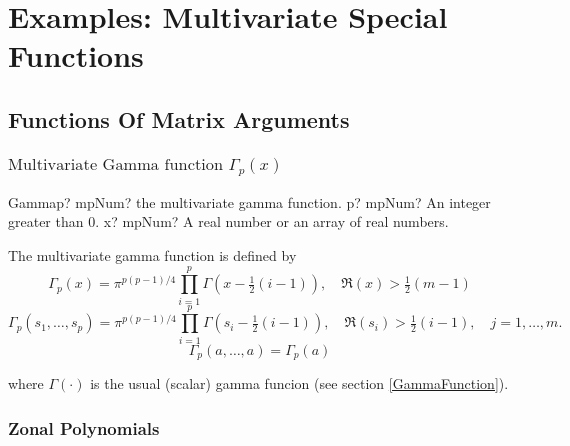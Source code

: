 

\chapter{Examples: Multivariate Special Functions}


\section{Functions Of Matrix Arguments}
\label{FunctionsOfMatrixArguments}



\subsection{\texorpdfstring{$\text{Multivariate Gamma function }\Gamma_p(x)$}{Multivariate Gamma}}
\label{MultivariateGammaFunction} 


\begin{mpFunctionsExtract}
	\mpFunctionTwoNotImplemented
	{Gammap? mpNum? the multivariate gamma function.}
	{p? mpNum? An integer greater than 0.}
	{x? mpNum? A real number or an array of real numbers.}	
\end{mpFunctionsExtract}


\vspace{0.3cm}
The multivariate gamma function is defined by
\begin{equation}
	\Gamma_p(x)  = \pi^{p(p-1)/4} \prod_{i=1}^p \Gamma\left(x-\tfrac{1}{2}(i-1)\right), \quad \Re(x) > \tfrac{1}{2}(m-1)
\end{equation}
\begin{equation}
	\Gamma_p(s_1,\ldots,s_p)  = \pi^{p(p-1)/4} \prod_{i=1}^p \Gamma\left(s_i-\tfrac{1}{2}(i-1)\right), \quad \Re(s_i) > \tfrac{1}{2}(i-1), \quad j=1,\ldots,m.
\end{equation}
\begin{equation}
	\Gamma_p(a,\ldots,a)  = \Gamma_p(a)
\end{equation}

where $\Gamma(\cdot)$ is the usual (scalar) gamma funcion (see section \ref{GammaFunction}).





\newpage
\subsection{Zonal Polynomials}
\label{ZonalPolynomials}

